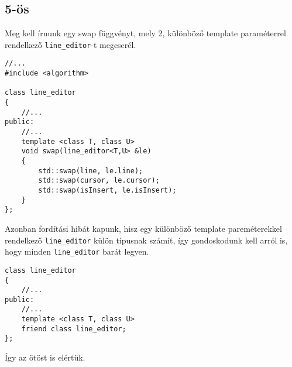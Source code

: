 \documentclass[a4paper,11.5pt,table]{article}
\begin{document}
	\subsection{5-ös}
	Meg kell írnunk egy swap függvényt, mely 2, különböző template paraméterrel rendelkező \texttt{line\_editor}-t megcserél.
	\begin{lstlisting}
//...
#include <algorithm>

class line_editor
{
	//...
public:
	//...
	template <class T, class U>
	void swap(line_editor<T,U> &le)
	{
		std::swap(line, le.line);
		std::swap(cursor, le.cursor);
		std::swap(isInsert, le.isInsert);
	}
};
	\end{lstlisting}
	Azonban fordítási hibát kapunk, hisz egy különböző template pareméterekkel rendelkező \texttt{line\_editor} külön típusnak számít, így gondoskodunk kell arról is, hogy minden \texttt{line\_editor} barát legyen.
	\begin{lstlisting}
class line_editor
{
	//...
public:
	//...
	template <class T, class U>
	friend class line_editor;
};
	\end{lstlisting}
	Így az ötöst is elértük.
\end{document}
